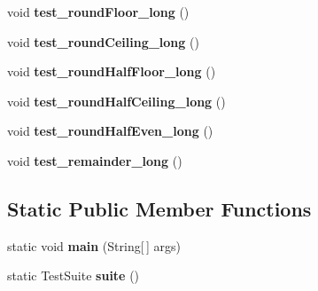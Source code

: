 \begin{DoxyCompactItemize}
\item 
\hypertarget{classorg_1_1joda_1_1time_1_1field_1_1_test_base_date_time_field_af09c0edce52a0bf369ad6622afac6f53}{void {\bfseries test\-\_\-round\-Floor\-\_\-long} ()}\label{classorg_1_1joda_1_1time_1_1field_1_1_test_base_date_time_field_af09c0edce52a0bf369ad6622afac6f53}

\item 
\hypertarget{classorg_1_1joda_1_1time_1_1field_1_1_test_base_date_time_field_ac8a13b1101d316e91b5fdf39560f27da}{void {\bfseries test\-\_\-round\-Ceiling\-\_\-long} ()}\label{classorg_1_1joda_1_1time_1_1field_1_1_test_base_date_time_field_ac8a13b1101d316e91b5fdf39560f27da}

\item 
\hypertarget{classorg_1_1joda_1_1time_1_1field_1_1_test_base_date_time_field_a29775001f1180d5e51a04e2ce4630738}{void {\bfseries test\-\_\-round\-Half\-Floor\-\_\-long} ()}\label{classorg_1_1joda_1_1time_1_1field_1_1_test_base_date_time_field_a29775001f1180d5e51a04e2ce4630738}

\item 
\hypertarget{classorg_1_1joda_1_1time_1_1field_1_1_test_base_date_time_field_a472cc0090a1cd77fd44f05b21c5d0b3a}{void {\bfseries test\-\_\-round\-Half\-Ceiling\-\_\-long} ()}\label{classorg_1_1joda_1_1time_1_1field_1_1_test_base_date_time_field_a472cc0090a1cd77fd44f05b21c5d0b3a}

\item 
\hypertarget{classorg_1_1joda_1_1time_1_1field_1_1_test_base_date_time_field_af46b69bd16b28cfe205f3d64b642ee89}{void {\bfseries test\-\_\-round\-Half\-Even\-\_\-long} ()}\label{classorg_1_1joda_1_1time_1_1field_1_1_test_base_date_time_field_af46b69bd16b28cfe205f3d64b642ee89}

\item 
\hypertarget{classorg_1_1joda_1_1time_1_1field_1_1_test_base_date_time_field_ad3c31fce1f1206aced17f33b1805cf02}{void {\bfseries test\-\_\-remainder\-\_\-long} ()}\label{classorg_1_1joda_1_1time_1_1field_1_1_test_base_date_time_field_ad3c31fce1f1206aced17f33b1805cf02}

\end{DoxyCompactItemize}
\subsection*{Static Public Member Functions}
\begin{DoxyCompactItemize}
\item 
\hypertarget{classorg_1_1joda_1_1time_1_1field_1_1_test_base_date_time_field_a83a85cda1451f4b354c421a322f34fc3}{static void {\bfseries main} (String\mbox{[}$\,$\mbox{]} args)}\label{classorg_1_1joda_1_1time_1_1field_1_1_test_base_date_time_field_a83a85cda1451f4b354c421a322f34fc3}

\item 
\hypertarget{classorg_1_1joda_1_1time_1_1field_1_1_test_base_date_time_field_ab197566f80fd051065220a75f86380e6}{static Test\-Suite {\bfseries suite} ()}\label{classorg_1_1joda_1_1time_1_1field_1_1_test_base_date_time_field_ab197566f80fd051065220a75f86380e6}

\end{DoxyCompactItemize}
